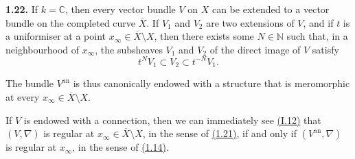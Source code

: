 \documentclass{report}
\newenvironment{itenv}[1]
  {\phantomsection\par\medskip\noindent\textbf{#1.}\itshape}
  {\medskip}
\newenvironment{rmenv}[1]
  {\phantomsection\par\medskip\noindent\textbf{#1.}\rmfamily}
  {\medskip}
\newcommand{\CC}{\mathbb{C}}
\newcommand{\NN}{\mathbb{N}}
\newcommand{\an}{\mathrm{an}}
\newcommand{\oldpage}[1]{\marginpar{\footnotesize$\Big\vert$ \textit{p.~#1}}}
\begin{document}
\begin{rmenv}{1.22}
\label{II.1.22}
  If $k=\CC$, then every vector bundle $V$ on $X$ can be extended to a vector bundle on the completed curve $\overline{X}$.
  If $V_1$ and $V_2$ are two extensions of $V$, and if $t$ is a uniformiser at a point $x_\infty\in\overline{X}\setminus X$, then there exists some $N\in\NN$ such that, in a neighbourhood of $x_\infty$, the subsheaves $V_1$ and $V_2$ of the direct image of $V$
\oldpage{58}
  satisfy
  \[
    t^N V_1\subset V_2 \subset t^{-N}V_1.
  \]

  The bundle $V^\an$ is thus canonically endowed with a structure that is meromorphic at every $x_\infty\in\overline{X}\setminus X$.

  If $V$ is endowed with a connection, then we can immediately see \hyperref[II.1.12]{(I.12)} that $(V,\nabla)$ is regular at $x_\infty\in\overline{X}\setminus X$, in the sense of \hyperref[II.1.21]{(1.21)}, if and only if $(V^\an,\nabla)$ is regular at $x_\infty$, in the sense of \hyperref[II.1.14]{(1.14)}.
\end{rmenv}




\end{document}
